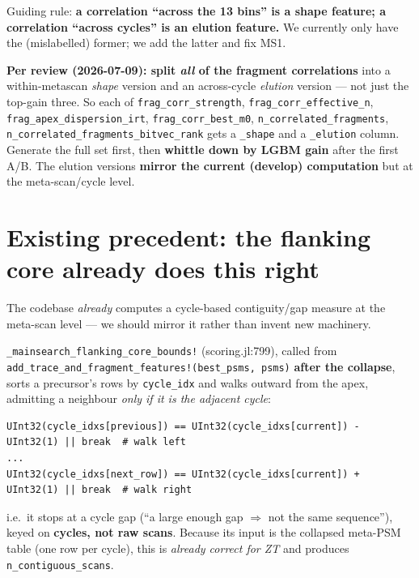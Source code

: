 \documentclass[11pt]{article}
\newcommand{\code}[1]{\texttt{\small #1}}
\begin{document}
\noindent Guiding rule: \textbf{a correlation ``across the 13 bins'' is a shape
feature; a correlation ``across cycles'' is an elution feature.} We currently only
have the (mislabelled) former; we add the latter and fix MS1.

\medskip
\noindent\textbf{Per review (2026-07-09): split \emph{all} of the fragment
correlations} into a within-metascan \emph{shape} version and an across-cycle
\emph{elution} version --- not just the top-gain three. So each of
\code{frag\_corr\_strength}, \code{frag\_corr\_effective\_n},
\code{frag\_apex\_dispersion\_irt}, \code{frag\_corr\_best\_m0},
\code{n\_correlated\_fragments}, \code{n\_correlated\_fragments\_bitvec\_rank} gets a
\code{*\_shape} and a \code{*\_elution} column. Generate the full set first, then
\textbf{whittle down by LGBM gain} after the first A/B. The elution versions
\textbf{mirror the current (develop) computation} but at the meta-scan/cycle level.

\section{Existing precedent: the flanking core already does this right}

The codebase \emph{already} computes a cycle-based contiguity/gap measure at the
meta-scan level --- we should mirror it rather than invent new machinery.

\code{\_mainsearch\_flanking\_core\_bounds!} (scoring.jl:799), called from
\code{add\_trace\_and\_fragment\_features!(best\_psms, psms)} \textbf{after the
collapse}, sorts a precursor's rows by \code{cycle\_idx} and walks outward from the
apex, admitting a neighbour \emph{only if it is the adjacent cycle}:
\begin{lstlisting}[firstnumber=854]
UInt32(cycle_idxs[previous]) == UInt32(cycle_idxs[current]) - UInt32(1) || break  # walk left
...
UInt32(cycle_idxs[next_row]) == UInt32(cycle_idxs[current]) + UInt32(1) || break  # walk right
\end{lstlisting}
i.e.\ it stops at a cycle gap (``a large enough gap $\Rightarrow$ not the same
sequence''), keyed on \textbf{cycles, not raw scans}. Because its input is the
collapsed meta-PSM table (one row per cycle), this is \emph{already correct for ZT}
and produces \code{n\_contiguous\_scans}.
\end{document}
